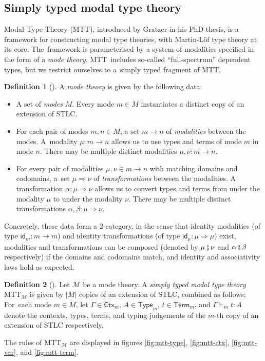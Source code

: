 \documentclass{scrartcl}
\theoremstyle{definition}
\newtheorem{definition}{Definition}
\theoremstyle{plain}
\newcommand{\modetheory}[1]{\mathcal{#1}}
\newcommand{\M}{\modetheory{M}}
\newcommand{\MTTM}{MTT${}_{\M}$}
\begin{document}

\subsection{Simply typed modal type theory}
Modal Type Theory (MTT), introduced by Gratzer in his PhD
thesis\cite{gratzer2023syntax}, is a framework for constructing modal type
theories, with Martin-Löf type theory at its core. The~framework is
parameterised by a system of modalities specified in the form of a \emph{mode
theory}. MTT~includes so-called ``full-spectrum'' dependent types, but we
restrict ourselves to a~simply typed fragment of MTT.
\begin{definition}[{\cite[§6.1.1]{gratzer2023syntax}}]
  A \emph{mode theory} is given by the following data:
  \begin{itemize}
  \item
    A set of \emph{modes} $M$. Every mode $m \in M$ instantiates a distinct
    copy of an extension of STLC.
  \item
    For each pair of modes $m, n \in M$, a set $m \to n$ of \emph{modalities}
    between the modes. A~modality $\mu : m \to n$ allows us to use types and
    terms of mode $m$ in mode $n$. There may be multiple distinct modalities
    $\mu , \nu : m \to n$.
  \item
    For every pair of modalities $\mu, \nu \in m \to n$ with matching domains
    and codomains, a~set $\mu \Rightarrow \nu$ of \emph{transformations}
    between the modalities. A transformation $\alpha : \mu \Rightarrow \nu$
    allows us to convert types and terms from under the modality $\mu$ to under
    the modality $\nu$. There may be multiple distinct transformations $\alpha,
    \beta : \mu \Rightarrow \nu$.
  \end{itemize}
  Concretely, these data form a 2-category, in the sense that identity
  modalities (of type $\textsf{id}_m : m \to m$) and identity transformations
  (of type $\textsf{id}_\mu : \mu \Rightarrow \mu $) exist, modalities and
  transformations can be composed (denoted by $\mu \fatsemi \nu$ and $\alpha
  \fatsemi \beta$ respectively) if the domains and codomains match, and
  identity and associativity laws hold as expected\cite{licata2016adjoint}.
\end{definition}
\begin{definition}[{\cite[following §6.2]{gratzer2023syntax}}]
  Let $\M$ be a mode theory. A \emph{simply typed modal type theory} \MTTM{} is
  given by $|M|$ copies of an extension of STLC, combined as follows: For~each
  mode $m \in M$, let $\Gamma\in\textsf{Ctx}_m$, $A \in \textsf{Type}_m$, $t
  \in \textsf{Term}_m$, and $\Gamma \vdash_m t : A$ denote the contexts, types,
  terms, and typing judgements of the $m$-th copy of an extension of STLC
  respectively.

  The rules of \MTTM{} are displayed in figures \ref{fig:mtt-type},
  \ref{fig:mtt-ctx}, \ref{fig:mtt-var}, and \ref{fig:mtt-term}.
\end{definition}
\end{document}
